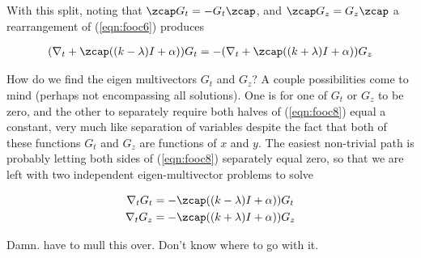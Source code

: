 With this split, noting that $\zcap G_t = -G_t \zcap$, and $\zcap G_z = G_z \zcap$ a rearrangement of (\ref{eqn:fooc6}) produces

\begin{align}\label{eqn:fooc8}
(\grad_t + \zcap ((k-\lambda) I + \alpha)) G_t = -(\grad_t + \zcap ((k+\lambda) I + \alpha)) G_z
\end{align}

How do we find the eigen multivectors $G_t$ and $G_z$?  A couple possibilities come to mind (perhaps not encompassing all solutions).  One is for one of $G_t$ or $G_z$ to be zero, and the other to separately require both halves of (\ref{eqn:fooc8}) equal a constant, very much like separation of variables despite the fact that both of these functions $G_t$ and $G_z$ are functions of $x$ and $y$.  The easiest non-trivial path is probably letting both sides of (\ref{eqn:fooc8}) separately equal zero, so that we are left with two independent eigen-multivector problems to solve

\begin{align}\label{eqn:fooc9}
\grad_t G_t &= -\zcap ((k-\lambda) I + \alpha)) G_t \\
\grad_t G_z &= -\zcap ((k+\lambda) I + \alpha)) G_z
\end{align}

Damn.  have to mull this over.  Don't know where to go with it.

\EndArticle
